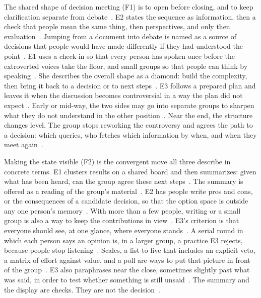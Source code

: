 The shared shape of decision meeting (F1) is to open before closing, and to keep
clarification separate from debate~.
E2 states the sequence as information, then a check that people mean the same thing, then
perspectives, and only then evaluation~.
Jumping from a document into debate is named as a source of decisions that people would
have made differently if they had understood the point~.
E1 uses a check-in so that every person has spoken once before the extroverted voices take
the floor, and small groups so that people can think by speaking~.
She describes the overall shape as a diamond: build the complexity, then bring it back to a
decision or to next steps~.
E3 follows a prepared plan and leaves it when the discussion becomes controversial in a way
the plan did not expect~.
Early or mid-way, the two sides may go into separate groups to sharpen what they do not
understand in the other position~.
Near the end, the structure changes level.
The group stops reworking the controversy and agrees the path to a decision: which queries,
who fetches which information by when, and when they meet again~.

Making the state visible (F2) is the convergent move all three describe in concrete terms.
E1 clusters results on a shared board and then summarizes: given what has been heard, can
the group agree these next steps~.
The summary is offered as a reading of the group's material~.
E2 has people write pros and cons, or the consequences of a candidate decision, so that the
option space is outside any one person's memory~.
With more than a few people, writing or a small group is also a way to keep the contributions
in view~.
E3's criterion is that everyone should see, at one glance, where everyone
stands~.
A serial round in which each person says an opinion is, in a larger group, a practice E3
rejects, because people stop listening~.
Scales, a fist-to-five that includes an explicit veto, a matrix of effort against value, and
a poll are ways to put that picture in front of the group~.
E3 also paraphrases near the close, sometimes slightly past what was said, in order to test
whether something is still unsaid~.
The summary and the display are checks.
They are not the decision~.

